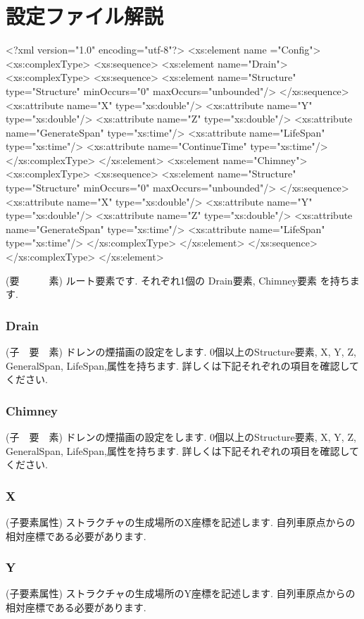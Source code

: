 \documentclass[paper={550pt,1200pt},lualatex , ja=standard]{bxjsreport}
\begin{document}
\section*{設定ファイル解説}
\begin{refxsdlisting}[title=XSD定義,]
<?xml version="1.0" encoding="utf-8"?>
<xs:element name ="Config">
	<xs:complexType>
		<xs:sequence>
			<xs:element name="Drain">
				<xs:complexType>
					<xs:sequence>
						<xs:element name="Structure" type="Structure" minOccurs="0" maxOccurs="unbounded"/> 
					</xs:sequence>
					<xs:attribute name="X" type="xs:double"/>
					<xs:attribute name="Y" type="xs:double"/>
					<xs:attribute name="Z" type="xs:double"/>
					<xs:attribute name="GenerateSpan" type="xs:time"/>	
					<xs:attribute name="LifeSpan" type="xs:time"/>	
                    <xs:attribute name="ContinueTime" type="xs:time"/>				
				</xs:complexType>
			</xs:element>
			<xs:element name="Chimney">
				<xs:complexType>
					<xs:sequence>
						<xs:element name="Structure" type="Structure" minOccurs="0" maxOccurs="unbounded"/> 
					</xs:sequence>
					<xs:attribute name="X" type="xs:double"/>
					<xs:attribute name="Y" type="xs:double"/>
					<xs:attribute name="Z" type="xs:double"/>
					<xs:attribute name="GenerateSpan" type="xs:time"/>
					<xs:attribute name="LifeSpan" type="xs:time"/>
				</xs:complexType>
			</xs:element>
		</xs:sequence>
	</xs:complexType>
</xs:element>
\end{refxsdlisting}
(要　　　素) ルート要素です. それぞれ1個の Drain要素, Chimney要素 を持ちます.
\subsubsection*{Drain}
(子　要　素) ドレンの煙描画の設定をします. 0個以上のStructure要素, X, Y, Z, GeneralSpan, LifeSpan,属性を持ちます. 詳しくは下記それぞれの項目を確認してください.
\subsubsection*{Chimney}
(子　要　素) ドレンの煙描画の設定をします. 0個以上のStructure要素, X, Y, Z, GeneralSpan, LifeSpan,属性を持ちます. 詳しくは下記それぞれの項目を確認してください.
\subsubsection*{X}
(子要素属性) ストラクチャの生成場所のX座標を記述します. 自列車原点からの相対座標である必要があります.
\subsubsection*{Y}
(子要素属性) ストラクチャの生成場所のY座標を記述します. 自列車原点からの相対座標である必要があります.
\end{document}

